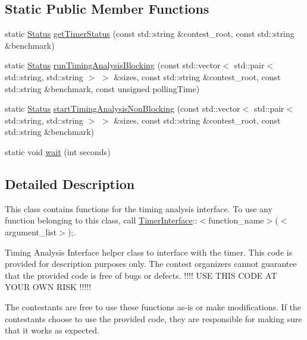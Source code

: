 \subsection*{Static Public Member Functions}
\begin{DoxyCompactItemize}
\item 
static \hyperlink{classTimerInterface_afc6cca620922cd5a3d90ea9ad7d7d25d}{Status} \hyperlink{classTimerInterface_a42077a21e0b9a07b6768e5131415bd2d}{get\-Timer\-Status} (const std\-::string \&contest\-\_\-root, const std\-::string \&benchmark)
\item 
static \hyperlink{classTimerInterface_afc6cca620922cd5a3d90ea9ad7d7d25d}{Status} \hyperlink{classTimerInterface_ada94a843a56747a6a7b34373a266ab92}{run\-Timing\-Analysis\-Blocking} (const std\-::vector$<$ std\-::pair$<$ std\-::string, std\-::string $>$ $>$ \&sizes, const std\-::string \&contest\-\_\-root, const std\-::string \&benchmark, const unsigned polling\-Time)
\item 
static \hyperlink{classTimerInterface_afc6cca620922cd5a3d90ea9ad7d7d25d}{Status} \hyperlink{classTimerInterface_a9a9b69817bbbd603c3d47089b0bad829}{start\-Timing\-Analysis\-Non\-Blocking} (const std\-::vector$<$ std\-::pair$<$ std\-::string, std\-::string $>$ $>$ \&sizes, const std\-::string \&contest\-\_\-root, const std\-::string \&benchmark)
\item 
static void \hyperlink{classTimerInterface_aa62e01d4dd296f8bf9f716ff2da7c5fc}{wait} (int seconds)
\end{DoxyCompactItemize}


\subsection{Detailed Description}
This class contains functions for the timing analysis interface. To use any function belonging to this class, call \hyperlink{classTimerInterface}{Timer\-Interface}\-:\-:$<$function\-\_\-name$>$($<$argument\-\_\-list$>$);. 

Timing Analysis Interface helper class to interface with the timer. This code is provided for description purposes only. The contest organizers cannot guarantee that the provided code is free of bugs or defects. !!!! U\-S\-E T\-H\-I\-S C\-O\-D\-E A\-T Y\-O\-U\-R O\-W\-N R\-I\-S\-K !!!!!

The contestants are free to use these functions as-\/is or make modifications. If the contestants choose to use the provided code, they are responsible for making sure that it works as expected.

